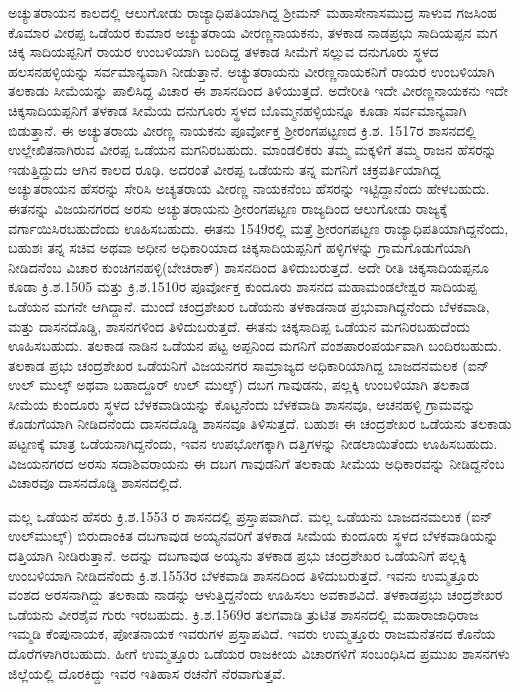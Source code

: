 ಅಚ್ಯುತರಾಯನ ಕಾಲದಲ್ಲಿ ಆಲುಗೋಡು ರಾಜ್ಯಾಧಿಪತಿಯಾಗಿದ್ದ ಶ‍್ರೀಮನ್​ ಮಹಾಸೇನಾಸಮುದ್ರ ಸಾಳುವ ಗಜಸಿಂಹ ಕೊಮಾರ ವೀರಪ್ಪ ಒಡೆಯರ ಕುಮಾರ ಅಚ್ಯುತರಾಯ ವೀರಣ್ಣನಾಯಕನು, ತಳಕಾಡ ನಾಡಪ್ರಭು ಸಾದಿಯಪ್ಪನ ಮಗ ಚಿಕ್ಕ ಸಾದಿಯಪ್ಪನಿಗೆ ರಾಯರ ಉಂಬಳಿಯಾಗಿ ಬಂದಿದ್ದ ತಳಕಾಡ ಸೀಮೆಗೆ ಸಲ್ಲುವ ದನುಗೂರು ಸ್ಥಳದ ಹಲಸನಹಳ್ಳಿಯನ್ನು ಸರ್ವಮಾನ್ಯವಾಗಿ ನೀಡುತ್ತಾನೆ. ಅಚ್ಯುತರಾಯನು ವೀರಣ್ಣನಾಯಕನಿಗೆ ರಾಯರ ಉಂಬಳಿಯಾಗಿ ತಲಕಾಡು ಸೀಮೆಯನ್ನು ಪಾಲಿಸಿದ್ದ ವಿಚಾರ ಈ ಶಾಸನದಿಂದ ತಿಳಿಯುತ್ತದೆ. ಅದೇರೀತಿ ಇದೇ ವೀರಣ್ಣನಾಯಕನು ಇದೇ ಚಿಕ್ಕಸಾದಿಯಪ್ಪನಿಗೆ ತಳಕಾಡ ಸೀಮೆಯ ದನುಗೂರು ಸ್ಥಳದ ಬೊಮ್ಮನಹಳ್ಳಿಯನ್ನೂ ಕೂಡಾ ಸರ್ವಮಾನ್ಯವಾಗಿ ಬಿಡುತ್ತಾನೆ. ಈ ಅಚ್ಯುತರಾಯ ವೀರಣ್ಣ ನಾಯಕನು ಪೂರ್ವೋಕ್ತ ಶ‍್ರೀರಂಗಪಟ್ಟಣದ ಕ್ರಿ.ಶ. 1517ರ ಶಾಸನದಲ್ಲಿ ಉಲ್ಲೇಖಿತನಾಗಿರುವ ವೀರಪ್ಪ ಒಡೆಯನ ಮಗನಿರಬಹುದು. ಮಾಂಡಲಿಕರು ತಮ್ಮ ಮಕ್ಕಳಿಗೆ ತಮ್ಮ ರಾಜನ ಹೆಸರನ್ನು ಇಡುತ್ತಿದ್ದುದು ಆಗಿನ ಕಾಲದ ರೂಢಿ. ಅದರಂತೆ ವೀರಪ್ಪ ಒಡೆಯನು ತನ್ನ ಮಗನಿಗೆ ಚಕ್ರವರ್ತಿಯಾಗಿದ್ದ ಅಚ್ಯುತರಾಯನ ಹೆಸರನ್ನು ಸೇರಿಸಿ ಅಚ್ಯತರಾಯ ವೀರಣ್ಣ ನಾಯಕನೆಂಬ ಹೆಸರನ್ನು ಇಟ್ಟಿದ್ದಾನೆಂದು ಹೇಳಬಹುದು. ಈತನನ್ನು ವಿಜಯನಗರದ ಅರಸು ಅಚ್ಯುತರಾಯನು ಶ‍್ರೀರಂಗಪಟ್ಟಣ ರಾಜ್ಯದಿಂದ ಆಲುಗೋಡು ರಾಜ್ಯಕ್ಕೆ ವರ್ಗಾಯಿಸಿರಬಹುದೆಂದು ಊಹಿಸಬಹುದು. ಈತನು 1549ರಲ್ಲಿ ಮತ್ತೆ ಶ‍್ರೀರಂಗಪಟ್ಟಣ ರಾಜ್ಯಾಧಿಪತಿಯಾಗಿದ್ದನೆಂದು, ಬಹುಶಃ ತನ್ನ ಸಚಿವ ಅಥವಾ ಅಧೀನ ಅಧಿಕಾರಿಯಾದ ಚಿಕ್ಕಸಾದಿಯಪ್ಪನಿಗೆ ಹಳ್ಳಿಗಳನ್ನು ಗ್ರಾಮಗೊಡುಗೆಯಾಗಿ ನೀಡಿದನೆಂಬ ವಿಚಾರ ಕುಂಚಿಗನಹಳ್ಳಿ(ಬೇಚಿರಾಕ್​) ಶಾಸನದಿಂದ ತಿಳಿದುಬರುತ್ತದೆ. ಅದೇ ರೀತಿ ಚಿಕ್ಕಸಾದಿಯಪ್ಪನೂ ಕೂಡಾ ಕ್ರಿ.ಶ.1505 ಮತ್ತು ಕ್ರಿ.ಶ.1510ರ ಪೂರ್ವೋಕ್ತ ಕುಂದೂರು ಶಾಸನದ ಮಹಾಮಂಡಲೇಶ್ವರ ಸಾದಿಯಪ್ಪ ಒಡೆಯನ ಮಗನೇ ಆಗಿದ್ದಾನೆ. ಮುಂದೆ ಚಂದ್ರಶೇಖರ ಒಡೆಯನು ತಳಕಾಡನಾಡ ಪ್ರಭುವಾಗಿದ್ದನೆಂದು ಬೆಳಕವಾಡಿ, ಮತ್ತು ದಾಸನದೊಡ್ಡಿ, ಶಾಸನಗಳಿಂದ ತಿಳಿದುಬರುತ್ತದೆ. ಈತನು ಚಿಕ್ಕಸಾದಿಪ್ಪ ಒಡೆಯನ ಮಗನಿರಬಹುದೆಂದು ಊಹಿಸಬಹುದು. ತಲಕಾಡ ನಾಡಿನ ಒಡೆಯನ ಪಟ್ಟ ಅಪ್ಪನಿಂದ ಮಗನಿಗೆ ವಂಶಪಾರಂಪರ್ಯವಾಗಿ ಬಂದಿರಬಹುದು. ತಲಕಾಡ ಪ್ರಭು ಚಂದ್ರಶೇಖರ ಒಡೆಯನಿಗೆ ವಿಜಯನಗರ ಸಾಮ್ರಾಜ್ಯದ ಅಧಿಕಾರಿಯಾಗಿದ್ದ ಬಾಜದನಮಲಕ (ಐನ್​ ಉಲ್​ ಮುಲ್ಕ್​ ಅಥವಾ ಬಹಾದ್ದೂರ್ ಉಲ್​ ಮುಲ್ಕ್​) ದಬಗ ಗಾವುಡನು, ಪಲ್ಲಕ್ಕಿ ಉಂಬಳಿಯಾಗಿ ತಲಕಾಡ ಸೀಮೆಯ ಕುಂದೂರು ಸ್ಥಳದ ಬೆಳಕವಾಡಿಯನ್ನು ಕೊಟ್ಟನೆಂದು ಬೆಳಕವಾಡಿ ಶಾಸನವೂ, ಆಚನಹಳ್ಳಿ ಗ್ರಾಮವನ್ನು ಕೊಡುಗೆಯಾಗಿ ನೀಡಿದನೆಂದು ದಾಸನದೊಡ್ಡಿ ಶಾಸನವೂ ತಿಳಿಸುತ್ತದೆ. ಬಹುಶಃ ಈ ಚಂದ್ರಶೇಖರ ಒಡೆಯನು ತಲಕಾಡು ಪಟ್ಟಣಕ್ಕೆ ಮಾತ್ರ ಒಡೆಯನಾಗಿದ್ದನೆಂದು, ಇವನ ಉಪಭೋಗಕ್ಕಾಗಿ ದತ್ತಿಗಳನ್ನು ನೀಡಲಾಯಿತೆಂದು ಊಹಿಸಬಹುದು. ವಿಜಯನಗರದ ಅರಸು ಸದಾಶಿವರಾಯನು ಈ ದಬಗ ಗಾವುಡನಿಗೆ ತಲಕಾಡು ಸೀಮೆಯ ಅಧಿಕಾರವನ್ನು ನೀಡಿದ್ದನೆಂಬ ವಿಚಾರವೂ ದಾಸನದೊಡ್ಡಿ ಶಾಸನದಲ್ಲಿದೆ.

ಮಲ್ಲ ಒಡೆಯನ ಹೆಸರು ಕ್ರಿ.ಶ.1553 ರ ಶಾಸನದಲ್ಲಿ ಪ್ರಸ್ತಾಪವಾಗಿದೆ. ಮಲ್ಲ ಒಡೆಯನು ಬಾಜದನಮಲುಕ (ಐನ್​ಉಲ್​ಮುಲ್ಕ್​) ಬಿರುದಾಂಕಿತ ದಬಗಾವುಡ ಅಯ್ಯನವರಿಗೆ ತಳಕಾಡ ಸೀಮೆಯ ಕುಂದೂರು ಸ್ಥಳದ ಬೆಳಕವಾಡಿಯನ್ನು ದತ್ತಿಯಾಗಿ ನೀಡಿರುತ್ತಾನೆ. ಅದನ್ನು ದಬಗಾವುಡ ಅಯ್ಯನು ತಳಕಾಡ ಪ್ರಭು ಚಂದ್ರಶೇಖರ ಒಡೆಯನಿಗೆ ಪಲ್ಲಕ್ಕಿ ಉಂಬಳಿಯಾಗಿ ನೀಡಿದನೆಂದು ಕ್ರಿ.ಶ.1553ರ ಬೆಳಕವಾಡಿ ಶಾಸನದಿಂದ ತಿಳಿದುಬರುತ್ತದೆ. ಇವನು ಉಮ್ಮತ್ತೂರು ವಂಶದ ಅರಸನಾಗಿದ್ದು ತಲಕಾಡು ನಾಡನ್ನು ಆಳುತ್ತಿದ್ದನೆಂದು ಊಹಿಸಲು ಅವಕಾಶವಿದೆ. ತಳಕಾಡಪ್ರಭು ಚಂದ್ರಶೇಖರ ಒಡೆಯನು ವೀರಶೈವ ಗುರು ಇರಬಹುದು. ಕ್ರಿ.ಶ.1569ರ ತಲಗವಾಡಿ ತ್ರುಟಿತ ಶಾಸನದಲ್ಲಿ ಮಹಾರಾಜಾಧಿರಾಜ ಇಮ್ಮಡಿ ಕೆಂಪುನಾಯಕ, ಪೋತನಾಯಕ ಇವರುಗಳ ಪ್ರಸ್ತಾಪವಿದೆ. ಇವರು ಉಮ್ಮತ್ತೂರು ರಾಜಮನೆತನದ ಕೊನೆಯ ದೊರೆಗಳಾಗಿರಬಹುದು. ಹೀಗೆ ಉಮ್ಮತ್ತೂರು ಒಡೆಯರ ರಾಜಕೀಯ ವಿಚಾರಗಳಿಗೆ ಸಂಬಂಧಿಸಿದ ಪ್ರಮುಖ ಶಾಸನಗಳು ಜಿಲ್ಲೆಯಲ್ಲಿ ದೊರಕಿದ್ದು ಇವರ ಇತಿಹಾಸ ರಚನೆಗೆ ನೆರವಾಗುತ್ತವೆ.



